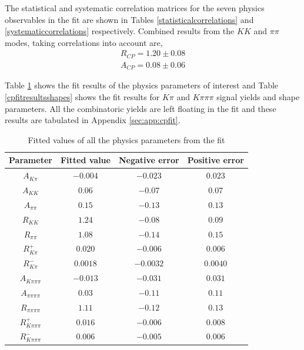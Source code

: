 The statistical and systematic correlation matrices for the seven physics observables in the fit are shown in Tables \ref{statisticalcorrelations} and \ref{systematiccorrelations} respectively. Combined results from the $KK$ and $\pi\pi$ modes, taking correlations into account are,
\begin{align*}
R_{CP} = 1.20 \pm 0.08 \\
A_{CP} = 0.08 \pm 0.06
\end{align*}

Table \ref{cpfitresultsphysics} shows the fit results of the physics parameters of interest and Table \ref{cpfitresultsshapes} shows the fit results for $K\pi$ and $K\pi\pi\pi$ signal yields and shape parameters. All the combinatoric yields are left floating in the fit and these results are tabulated in Appendix \ref{sec:app:cpfit}.

\begin{table}[h]
\centering
{\footnotesize
\begin{tabular}{cccc}
Parameter & Fitted value & Negative error & Positive error \\
\hline
$A_{K\pi}$ & $-0.004$ & $-0.023$ & $0.023$ \\
$A_{KK}$ & $0.06$ & $-0.07$ & $0.07$ \\
$A_{\pi\pi}$ & $0.15$ & $-0.13$ & $0.13$ \\
$R_{KK}$ & $1.24$ & $-0.08$ & $0.09$ \\
$R_{\pi\pi}$ & $1.08$ & $-0.14$ & $0.15$ \\
$R^+_{K\pi}$ & $0.020$ & $-0.006$ & $0.006$ \\
$R^-_{K\pi}$ & $0.0018$ & $-0.0032$ & $0.0040$ \\
$A_{K\pi\pi\pi}$ & $-0.013$ & $-0.031$ & $0.031$ \\
$A_{\pi\pi\pi\pi}$ & $0.03$ & $-0.11$ & $0.11$ \\
$R_{\pi\pi\pi\pi}$ & $1.11$ & $-0.12$ & $0.13$ \\
$R^+_{K\pi\pi\pi}$ & $0.016$ & $-0.006$ & $0.008$ \\
$R^-_{K\pi\pi\pi}$ & $0.006$ & $-0.005$ & $0.006$ \\
\end{tabular}}
\caption{Fitted values of all the physics parameters from the \CP fit}
\label{cpfitresultsphysics}
\end{table}

